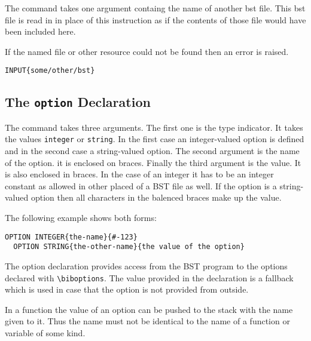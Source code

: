 The command takes one argument containg the name of another bst file.
This bst file is read in in place of this instruction as if the
contents of those file would have been included here. 

If the named file or other resource could not be found then an error
is raised.

\begin{lstlisting}[language=bst]
  INPUT{some/other/bst}
\end{lstlisting}


\subsection{The \texttt{option} Declaration}

The command takes three arguments. The first one is the type
indicator. It takes the values \texttt{integer} or \texttt{string}. In
the first case an integer-valued option is defined and in the second
case a string-valued option. The second argument is the name of the
option. it is enclosed on braces. Finally the third argument is the
value. It is also enclosed in braces. In the case of an integer it has
to be an integer constant as allowed in other placed of a BST file as
well. If the option is a string-valued option then all characters in
the balenced braces make up the value.

The following example shows both forms:

\begin{lstlisting}[language=bst]
  OPTION INTEGER{the-name}{#-123}
  OPTION STRING{the-other-name}{the value of the option}
\end{lstlisting}

The option declaration provides access from the BST program to the
options declared with \verb|\biboptions|. The value provided in the
declaration is a fallback which is used in case that the option is not
provided from outside.

In a function the value of an option can be pushed to the stack with
the name given to it. Thus the name must not be identical to the name
of a function or variable of some kind.


